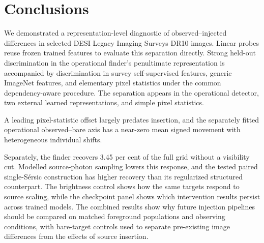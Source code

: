 \section{Conclusions}
\label{sec:conclusions}

We demonstrated a representation-level diagnostic of observed--injected
differences in selected DESI Legacy Imaging Surveys DR10 images. Linear probes
reuse frozen trained features to evaluate this separation directly.
Strong held-out discrimination in the operational finder's penultimate
representation is accompanied by discrimination in survey self-supervised
features, generic ImageNet features, and elementary pixel statistics under the
common dependency-aware procedure. The separation appears in the operational
detector, two external learned representations, and simple pixel statistics.

A leading pixel-statistic offset largely predates insertion, and the
separately fitted operational observed--bare axis has a near-zero mean signed
movement with heterogeneous individual shifts.

Separately, the finder recovers 3.45 per cent of the full grid without a
visibility cut.
Modelled source-photon sampling lowers this response, and the tested paired
single-S\'{e}rsic construction has higher recovery than its regularized
structured counterpart. The brightness control shows how the same targets
respond to source scaling, while the checkpoint panel shows which intervention
results persist across trained models. The combined results show why future
injection pipelines should be compared on matched foreground populations and
observing conditions, with bare-target controls used to separate pre-existing
image differences from the effects of source insertion.
